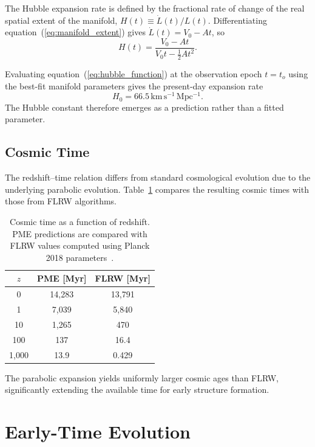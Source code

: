 \documentclass[fontsize=12pt, paper=a4]{scrartcl}
\begin{document}
The Hubble expansion rate is defined by the fractional rate of change of the real spatial extent of the manifold, $H(t) \equiv \dot{L}(t)/{L(t)}$. Differentiating equation~(\ref{eq:manifold_extent}) gives $\dot{L}(t)=V_0-At$, so
\begin{equation}
H(t) = \frac{V_0 - At}{V_0 t - \frac{1}{2}A t^2}.
\label{eq:hubble_function}
\end{equation}

Evaluating equation~(\ref{eq:hubble_function}) at the observation epoch $t=t_o$ using the best-fit manifold parameters gives the present-day expansion rate
\begin{equation}
H_0 = 66.5\,\mathrm{km\,s^{-1}\,Mpc^{-1}}.
\end{equation}
The Hubble constant therefore emerges as a prediction rather than a fitted parameter.

\subsection{Cosmic Time}

The redshift–time relation differs from standard cosmological evolution due to the underlying parabolic evolution. Table~\ref{tab:cosmic_time_comparison} compares the resulting cosmic times with those from FLRW algorithms.

\begin{table}
\centering
\begin{tabular}{|c|c|c|}
\hline
$z$ & PME [Myr] & FLRW [Myr] \\
\hline
0    & 14,283 & 13,791 \\
1    & 7,039 & 5,840 \\
10   & 1,265 & 470 \\
100  & 137 & 16.4 \\
1,000 & 13.9 & 0.429 \\
\hline
\end{tabular}
\caption{Cosmic time as a function of redshift. PME predictions are compared with FLRW values computed using Planck 2018 parameters~\cite{Planck2018}.}
\label{tab:cosmic_time_comparison}
\end{table}

The parabolic expansion yields uniformly larger cosmic ages than FLRW, significantly extending the available time for early structure formation.

\section{Early-Time Evolution}
\end{document}

